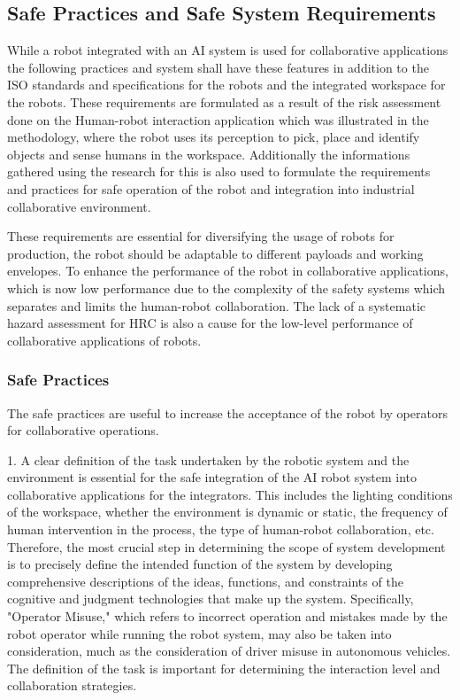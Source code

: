 {{\subsection{Safe Practices and Safe System Requirements}}

While a robot integrated with an AI system is used for collaborative applications the following practices and system shall have these features in addition to the ISO standards and specifications for the robots and the integrated workspace for the robots. These requirements are formulated as a result of the risk assessment done on the Human-robot interaction application which was illustrated in the methodology, where the robot uses its perception to pick, place and identify objects and sense humans in the workspace. Additionally the informations gathered using the research for this is also used to formulate the requirements and practices for safe operation of the robot and integration into industrial collaborative environment.

These requirements are essential for diversifying the usage of robots for production, the robot should be adaptable to different payloads and working envelopes.
To enhance the performance of the robot in collaborative applications, which is now low performance due to the complexity of the safety systems which separates and limits the human-robot collaboration.
The lack of a systematic hazard assessment for HRC is also a cause for the low-level performance of collaborative applications of robots.

{\subsubsection{Safe Practices}}

The safe practices are useful to increase the acceptance of the robot by operators for collaborative operations.

1. A clear definition of the task undertaken by the robotic system and the environment is essential for the safe integration of the AI robot system into collaborative applications for the integrators. This includes the lighting conditions of the workspace, whether the environment is dynamic or static, the frequency of human intervention in the process, the type of human-robot collaboration, etc. Therefore, the most crucial step in determining the scope of system development is to precisely define the intended function of the system by developing comprehensive descriptions of the ideas, functions, and constraints of the cognitive and judgment technologies that make up the system. Specifically, "Operator Misuse," which refers to incorrect operation and mistakes made by the robot operator while running the robot system, may also be taken into consideration, much as the consideration of driver misuse in autonomous vehicles.
The definition of the task is important for determining the interaction level and collaboration strategies.

}
